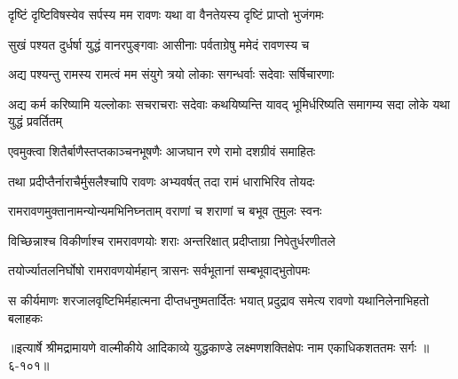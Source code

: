 \twolineshloka
{दृष्टिं दृष्टिविषस्येव सर्पस्य मम रावणः}
{यथा वा वैनतेयस्य दृष्टिं प्राप्तो भुजंगमः} %

\twolineshloka
{सुखं पश्यत दुर्धर्षा युद्धं वानरपुङ्गवाः}
{आसीनाः पर्वताग्रेषु ममेदं रावणस्य च} %

\twolineshloka
{अद्य पश्यन्तु रामस्य रामत्वं मम संयुगे}
{त्रयो लोकाः सगन्धर्वाः सदेवाः सर्षिचारणाः} %

\threelineshloka
{अद्य कर्म करिष्यामि यल्लोकाः सचराचराः}
{सदेवाः कथयिष्यन्ति यावद् भूमिर्धरिष्यति}
{समागम्य सदा लोके यथा युद्धं प्रवर्तितम्} %

\twolineshloka
{एवमुक्त्वा शितैर्बाणैस्तप्तकाञ्चनभूषणैः}
{आजघान रणे रामो दशग्रीवं समाहितः} %

\twolineshloka
{तथा प्रदीप्तैर्नाराचैर्मुसलैश्चापि रावणः}
{अभ्यवर्षत् तदा रामं धाराभिरिव तोयदः} %

\twolineshloka
{रामरावणमुक्तानामन्योन्यमभिनिघ्नताम्}
{वराणां च शराणां च बभूव तुमुलः स्वनः} %

\twolineshloka
{विच्छिन्नाश्च विकीर्णाश्च रामरावणयोः शराः}
{अन्तरिक्षात् प्रदीप्ताग्रा निपेतुर्धरणीतले} %

\twolineshloka
{तयोर्ज्यातलनिर्घोषो रामरावणयोर्महान्}
{त्रासनः सर्वभूतानां सम्बभूवाद्भुतोपमः} %

\twolineshloka
{स कीर्यमाणः शरजालवृष्टिभिर्महात्मना दीप्तधनुष्मतार्दितः}
{भयात् प्रदुद्राव समेत्य रावणो यथानिलेनाभिहतो बलाहकः} %


॥इत्यार्षे श्रीमद्रामायणे वाल्मीकीये आदिकाव्ये युद्धकाण्डे लक्ष्मणशक्तिक्षेपः नाम एकाधिकशततमः सर्गः ॥६-१०१॥

